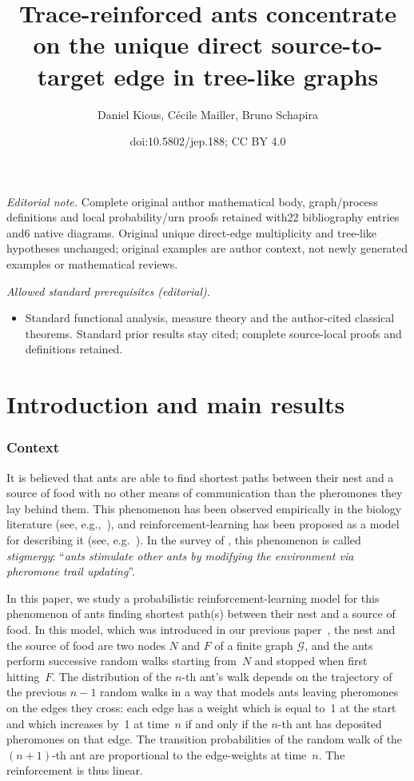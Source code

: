 \documentclass[10pt]{amsart}
\title{Trace-reinforced ants concentrate on the unique direct source-to-target edge in tree-like graphs}
\author{Daniel Kious, Cécile Mailler, Bruno Schapira}
\date{doi:10.5802/jep.188; CC BY 4.0}
\let\mathcal\mathscr
\numberwithin{equation}{section}
\theoremstyle{definition}
\begin{document}
\maketitle
\noindent\textit{Editorial note.} Complete original author mathematical body, graph/process definitions and local probability/urn proofs retained with22 bibliography entries and6 native diagrams. Original unique direct-edge multiplicity and tree-like hypotheses unchanged; original examples are author context, not newly generated examples or mathematical reviews.\par\medskip
\noindent\textit{Allowed standard prerequisites (editorial).}\begin{itemize}
\item Standard functional analysis, measure theory and the author-cited classical theorems. Standard prior results stay cited; complete source-local proofs and definitions retained.
\end{itemize}\medskip

\vspace*{-\baselineskip}
\tableofcontents


\section{Introduction and main results}
\subsubsection*{Context}
It is believed that ants are able to find shortest paths between their nest and a source of food
with no other means of communication than the pheromones they lay behind them.
This phenomenon has been observed empirically in the biology literature
(see, e.g.,~\cite{ants_89, Deneu90, current_ants}), and reinforcement-learning has been proposed as a model for {describing it} (see, e.g.~\cite{current_ants}).
In the survey of \cite[Ch.\,1]{book_ant}, this phenomenon is called \emph{stigmergy}: ``\emph{ants stimulate other ants by modifying the environment via pheromone trail updating}''.

In this paper, we study a probabilistic reinforcement-learning model
for this phenomenon of ants finding shortest path(s) between their nest and a source of food.
In this model, which was introduced in our previous paper~\cite{KMS},
the nest and the source of food are two nodes $N$ and $F$ of a finite graph $\mathcal G$,
and the ants perform successive random walks starting from~$N$ and stopped when first hitting~$F$.
The distribution of the $n$-th ant's walk depends on the trajectory of the previous $n-1$ random walks in a way that models ants leaving pheromones on the edges they cross:
each edge has a weight which is equal to~{1} at the start and which increases by~1
at time~$n$ if and only if the $n$-th ant has deposited pheromones on that edge.
The transition probabilities of the random walk of the $(n+1)$-th ant are proportional to the edge-weights at time~$n$.
The reinforcement is thus linear.
\end{document}
